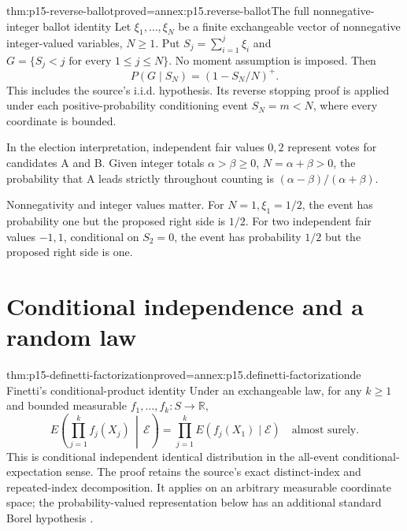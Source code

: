 \begin{hbtheorem}{thm:p15-reverse-ballot}{proved=annex:p15.reverse-ballot}{The full nonnegative-integer ballot identity}
Let \(\xi_1,\ldots,\xi_N\) be a finite exchangeable vector of
nonnegative integer-valued variables, \(N\geq1\).
Put \(S_j=\sum_{i=1}^j\xi_i\) and
\(G=\{S_j<j\text{ for every }1\leq j\leq N\}\).
No moment assumption is imposed. Then
\[
                        P(G\mid S_N)=(1-S_N/N)^+ .
\]
This includes the source's i.i.d. hypothesis. Its reverse stopping
proof is applied under each positive-probability conditioning event
\(S_N=m<N\), where every coordinate is bounded.

In the election interpretation, independent fair values \(0,2\)
represent votes for candidates A and B. Given integer totals
\(\alpha>\beta\geq0\), \(N=\alpha+\beta>0\), the probability that
A leads strictly throughout counting is
\((\alpha-\beta)/(\alpha+\beta)\).

Nonnegativity and integer values matter. For \(N=1,\xi_1=1/2\),
the event has probability one but the proposed right side is \(1/2\).
For two independent fair values \(-1,1\), conditional on \(S_2=0\),
the event has probability \(1/2\) but the proposed right side is one.
\end{hbtheorem}

\section{Conditional independence and a random law}

\begin{hbtheorem}{thm:p15-definetti-factorization}{proved=annex:p15.definetti-factorization}{de Finetti's conditional-product identity}
Under an exchangeable law, for any \(k\geq1\) and bounded measurable
\(f_1,\ldots,f_k:S\to\mathbb R\),
\[
 E\!\left(\prod_{j=1}^kf_j(X_j)\,\middle|\,\mathcal E\right)
                   =\prod_{j=1}^k E(f_j(X_1)\mid\mathcal E)
                                      \quad\text{almost surely}.
\]
This is conditional independent identical distribution in the
all-event conditional-expectation sense.
The proof retains the source's exact distinct-index and repeated-index
decomposition. It applies on an arbitrary measurable coordinate space;
the probability-valued representation below has an additional
standard Borel hypothesis
\cite[thm.~4.7.9]{DurrettPTEAuthor2019}.
\end{hbtheorem}

